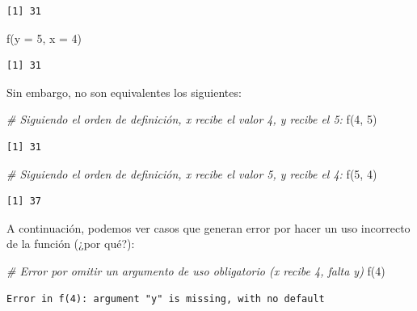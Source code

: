 \documentclass[
]{book}
\newenvironment{Shaded}{\begin{snugshade}}{\end{snugshade}}
\newcommand{\AttributeTok}[1]{\textcolor[rgb]{0.77,0.63,0.00}{#1}}
\newcommand{\CommentTok}[1]{\textcolor[rgb]{0.56,0.35,0.01}{\textit{#1}}}
\newcommand{\DecValTok}[1]{\textcolor[rgb]{0.00,0.00,0.81}{#1}}
\newcommand{\FunctionTok}[1]{\textcolor[rgb]{0.00,0.00,0.00}{#1}}
\newcommand{\NormalTok}[1]{#1}
\begin{document}
\begin{verbatim}
[1] 31
\end{verbatim}

\begin{Shaded}
\begin{Highlighting}[]
\FunctionTok{f}\NormalTok{(}\AttributeTok{y =} \DecValTok{5}\NormalTok{, }\AttributeTok{x =} \DecValTok{4}\NormalTok{)}
\end{Highlighting}
\end{Shaded}

\begin{verbatim}
[1] 31
\end{verbatim}

Sin embargo, no son equivalentes los siguientes:

\begin{Shaded}
\begin{Highlighting}[]
\CommentTok{\# Siguiendo el orden de definición, x recibe el valor 4, y recibe el 5:}
\FunctionTok{f}\NormalTok{(}\DecValTok{4}\NormalTok{, }\DecValTok{5}\NormalTok{)}
\end{Highlighting}
\end{Shaded}

\begin{verbatim}
[1] 31
\end{verbatim}

\begin{Shaded}
\begin{Highlighting}[]
\CommentTok{\# Siguiendo el orden de definición, x recibe el valor 5, y recibe el 4:}
\FunctionTok{f}\NormalTok{(}\DecValTok{5}\NormalTok{, }\DecValTok{4}\NormalTok{)}
\end{Highlighting}
\end{Shaded}

\begin{verbatim}
[1] 37
\end{verbatim}

A continuación, podemos ver casos que generan error por hacer un uso incorrecto de la función (¿por qué?):

\begin{Shaded}
\begin{Highlighting}[]
\CommentTok{\# Error por omitir un argumento de uso obligatorio (x recibe 4, falta y)}
\FunctionTok{f}\NormalTok{(}\DecValTok{4}\NormalTok{)}
\end{Highlighting}
\end{Shaded}

\begin{verbatim}
Error in f(4): argument "y" is missing, with no default
\end{verbatim}
\end{document}
